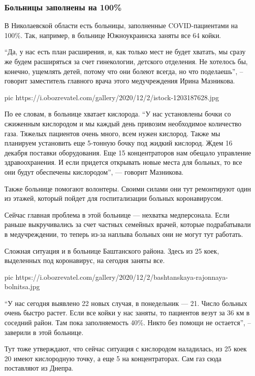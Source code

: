 \subsubsection{Больницы заполнены на 100\%}

В Николаевской области есть больницы, заполненные COVID-пациентами на 100\%.
Так, например, в больнице Южноукраинска заняты все 64 койки.

\enquote{Да, у нас есть план расширения, и, как только мест не будет хватать, мы сразу
же будем расширяться за счет гинекологии, детского отделения. Не хотелось бы,
конечно, ущемлять детей, потому что они болеют всегда, но что поделаешь}, –
говорит заместитель главного врача этого медучреждения Ирина Мазникова.

\ifcmt
pic https://i.obozrevatel.com/gallery/2020/12/2/istock-1203187628.jpg
\fi

По ее словам, в больнице хватает кислорода. \enquote{У нас установлены бочки со
сжиженным кислородом и мы каждый день привозим необходимое количество газа.
Тяжелых пациентов очень много, всем нужен кислород. Также мы планируем
установить еще 5-тонную бочку под жидкий кислород. Ждем 16 декабря поставки
оборудования. Еще 15 концентраторов нам обещало управление здравоохранения. И
если придется открывать новые места для больных, то все они будут обеспечены
кислородом}, --- говорит Мазникова.

Также больнице помогают волонтеры. Своими силами они тут ремонтируют один из
этажей, который пойдет для госпитализации больных коронавирусом.

Сейчас главная проблема в этой больнице --- нехватка медперсонала. Если раньше
выкручивались за счет частных семейных врачей, которые подрабатывали в
медучреждении, то теперь из-за наплыва больных они не могут тут работать.

Сложная ситуация и в больнице Баштанского района. Здесь из 25 коек, выделенных
под коронавирус, на сегодня заняты все.

\ifcmt
pic https://i.obozrevatel.com/gallery/2020/12/2/bashtanskaya-rajonnaya-bolnitsa.jpg
\fi

\enquote{У нас сегодня выявлено 22 новых случая, в понедельник --- 21. Число больных
очень быстро растет. Если все койки у нас заняты, то пациентов везут за 36 км в
соседний район. Там пока заполняемость 40\%. Никто без помощи не остается}, –
заверили в этой больнице.

Тут тоже утверждают, что сейчас ситуация с кислородом наладилась, из 25 коек 20
имеют кислородную точку, а еще 5 на концентраторах. Сам газ сюда поставляют из
Днепра.

